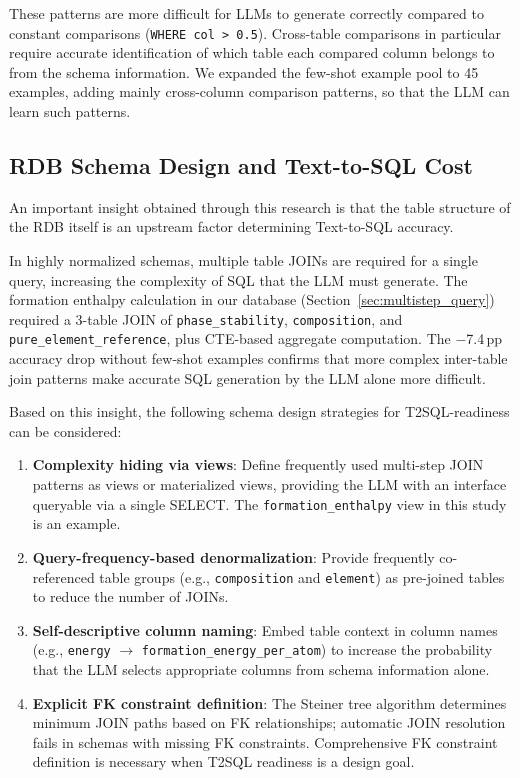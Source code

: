 \documentclass{npj-compt.mater}
\begin{document}
These patterns are more difficult for LLMs to generate correctly
compared to constant comparisons (\texttt{WHERE col > 0.5}).
Cross-table comparisons in particular require accurate
identification of which table each compared column belongs to
from the schema information.
We expanded the few-shot example pool to 45 examples, adding
mainly cross-column comparison patterns, so that the LLM can learn
such patterns.

\subsection{RDB Schema Design and Text-to-SQL Cost}
\label{sec:schema_design_cost}

An important insight obtained through this research is that the
table structure of the RDB itself is an upstream factor determining
Text-to-SQL accuracy.

In highly normalized schemas, multiple table JOINs are required
for a single query, increasing the complexity of SQL that the LLM
must generate.
The formation enthalpy calculation in our database
(Section~\ref{sec:multistep_query}) required a 3-table JOIN of
\texttt{phase\_stability}, \texttt{composition}, and
\texttt{pure\_element\_reference}, plus CTE-based aggregate
computation.
The $-$7.4\,pp accuracy drop without few-shot examples confirms
that more complex inter-table join patterns make accurate SQL
generation by the LLM alone more difficult.

Based on this insight, the following schema design strategies for
T2SQL-readiness can be considered:
\begin{enumerate}
  \item \textbf{Complexity hiding via views}:
    Define frequently used multi-step JOIN patterns as views or
    materialized views, providing the LLM with an interface
    queryable via a single SELECT.
    The \texttt{formation\_enthalpy} view in this study is an
    example.
  \item \textbf{Query-frequency-based denormalization}:
    Provide frequently co-referenced table groups
    (e.g., \texttt{composition} and \texttt{element}) as
    pre-joined tables to reduce the number of JOINs.
  \item \textbf{Self-descriptive column naming}:
    Embed table context in column names
    (e.g., \texttt{energy} $\to$ \texttt{formation\_energy\_per\_atom})
    to increase the probability that the LLM selects appropriate
    columns from schema information alone.
  \item \textbf{Explicit FK constraint definition}:
    The Steiner tree algorithm determines minimum JOIN paths based
    on FK relationships; automatic JOIN resolution fails in schemas
    with missing FK constraints.
    Comprehensive FK constraint definition is necessary when
    T2SQL readiness is a design goal.
\end{enumerate}
\end{document}
